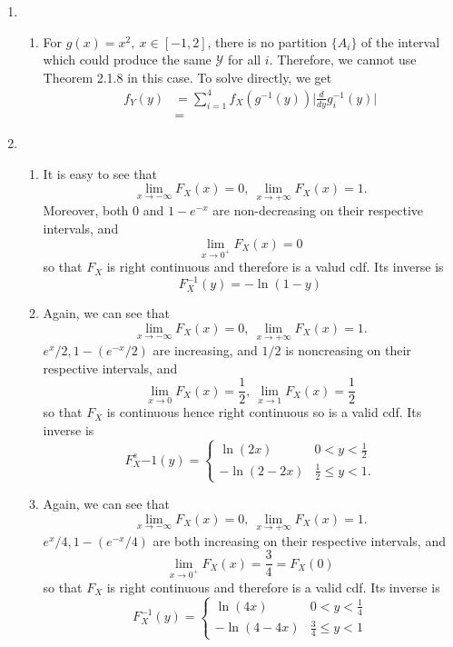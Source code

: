 \documentclass{article}
\begin{document}
\begin{enumerate}
    \item \begin{enumerate}
        \item For $g(x)=x^2, \ x \in [-1, 2]$, there is no partition $\{A_i\}$ of the interval which could produce the 
        same $\mathcal{Y}$ for all $i$. Therefore, we cannot use Theorem 2.1.8 in this case. To solve directly, we get 
        \begin{align*}
            f_{Y}(y) 
            &= \sum_{i = 1}^{4} f_{X}(g^{-1}(y)) \Big| \frac{d}{dy}g_{i}^{-1}(y) \Big| \\
            &= 
        \end{align*}
    \end{enumerate}

    \item \begin{enumerate}
        \item It is easy to see that 
        \[ \lim_{x \to -\infty} F_{X}(x) = 0, \ \lim_{x \to +\infty} F_{X}(x) = 1. \]
        Moreover, both $0$ and $1-e^{-x}$ are non-decreasing on their respective intervals, and 
        \[ \lim_{x \to 0^+} F_{X}(x) = 0 \]
        so that $F_X$ is right continuous and therefore is a valud cdf. Its inverse is 
        \[ F_{X}^{-1}(y) = -\ln{(1 - y)}\]

        \item Again, we can see that 
        \[ \lim_{x \to -\infty} F_{X}(x) = 0, \ \lim_{x \to +\infty} F_{X}(x) = 1. \]
        $e^{x} / 2, 1 - (e^{-x} / 2)$ are increasing, and $1/2$ is noncreasing on their respective intervals, and 
        \[ \lim_{x \to 0} F_{X}(x) = \frac{1}{2}, \ \lim_{x \to 1} F_{X}(x) = \frac{1}{2} \]
        so that $F_X$ is continuous hence right continuous so is a valid cdf. Its inverse is
        \[ F_{X}^s{-1}(y) = \begin{cases}
            \ln{(2x)} & 0 < y < \frac{1}{2} \\
            -\ln{(2-2x)} & \frac{1}{2} \leq y < 1.
        \end{cases} \]

        \item Again, we can see that 
        \[ \lim_{x \to -\infty} F_{X}(x) = 0, \ \lim_{x \to +\infty} F_{X}(x) = 1. \]
        $e^{x}/4, 1 - (e^{-x} / 4)$ are both increasing on their respective intervals, and 
        \[ \lim_{x \to 0^+} F_{X}(x) = \frac{3}{4} = F_{X}(0) \]
        so that $F_X$ is right continuous and therefore is a valid cdf. Its inverse is 
        \[ F_{X}^{-1}(y) = \begin{cases}
            \ln{(4x)} & 0 < y < \frac{1}{4} \\
            -\ln{(4-4x)} & \frac{3}{4} \leq y < 1
        \end{cases}\]
    \end{enumerate}


\end{enumerate}
\end{document}
